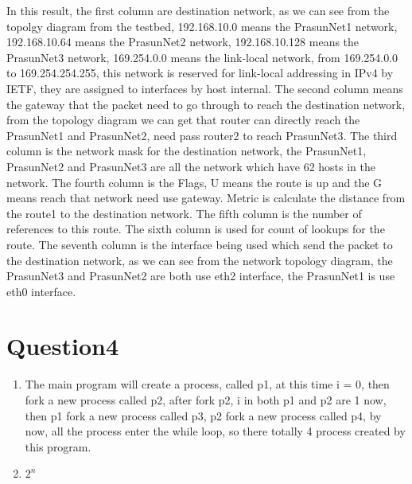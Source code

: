 \documentclass[a4paper,12pt]{article}
\begin{document}
In this result, the first column are destination network, as we can see from the topolgy diagram from the testbed, 192.168.10.0 means the PrasunNet1 network, 192.168.10.64 means the PrasunNet2 network, 192.168.10.128 means the PrasunNet3 network, 169.254.0.0 means the link-local network, from 169.254.0.0 to 169.254.254.255, this network is reserved for link-local addressing in IPv4 by IETF, they are assigned to interfaces by host internal. The second column means the gateway that the packet need to go through to reach the destination network, from the topology diagram we can get that router can directly reach the PrasunNet1 and PrasunNet2, need pass router2 to reach PrasunNet3. The third column is the network mask for the destination network, the PrasunNet1, PrasunNet2 and PrasunNet3 are all the network which have 62 hosts in the network. The fourth column is the Flags, U means the route is up and the G means reach that network need use gateway. Metric is calculate the distance from the route1 to the destination network. The fifth column is the number of references to this route. The sixth column is used for count of lookups for the route. The seventh column is the interface being used which send the packet to the destination network, as we can see from the network topology diagram, the PrasunNet3 and PrasunNet2 are both use eth2 interface, the PrasunNet1 is use eth0 interface.
\section*{Question4}
\begin{enumerate}
\item The main program will create a process, called p1, at this time i = 0, then fork a new process called p2, after fork p2, i in both p1 and p2 are 1 now, then p1 fork a new process called p3, p2 fork a new process called p4, by now, all the process enter the while loop, so there totally 4 process created by this program.
\item $2^n$
\end{enumerate}
\end{document}
